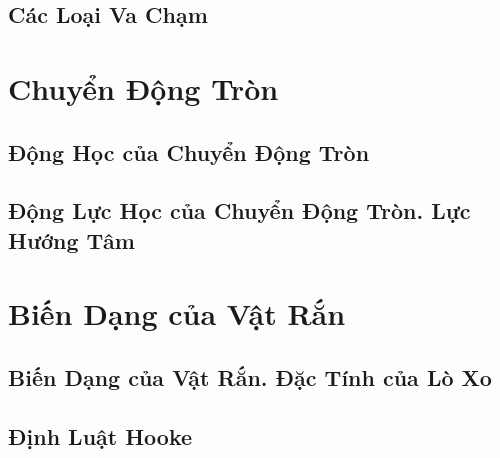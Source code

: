 \documentclass[oneside]{book}
\numberwithin{equation}{section}
\begin{document}
\section{Các Loại Va Chạm}


\chapter{Chuyển Động Tròn}

\section{Động Học của Chuyển Động Tròn}

\section{Động Lực Học của Chuyển Động Tròn. Lực Hướng Tâm}


\chapter{Biến Dạng của Vật Rắn}

\section{Biến Dạng của Vật Rắn. Đặc Tính của Lò Xo}

\section{Định Luật Hooke}


\printbibliography[heading=bibintoc]
	
\end{document}
